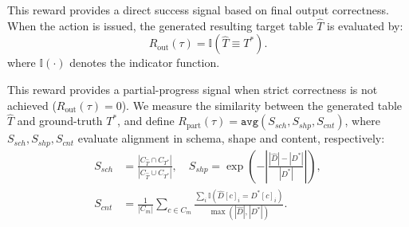 This reward provides a direct success signal based on final output correctness. When the  action is issued, the generated resulting target table $\hat{T}$ is evaluated by:
\begin{equation}
R_{\text{out}}(\tau) = \mathbb{I}(\hat{T} \equiv T^*).
\end{equation}
where $\mathbb{I}(\cdot)$ denotes the indicator function.



This reward provides a partial-progress signal when strict correctness is not achieved ($R_{\text{out}}(\tau)=0$). We measure the similarity between the generated table $\hat{T}$ and ground-truth $T^*$, and define $R_{\text{part}}(\tau) = \texttt{avg}(S_{sch}, S_{shp}, S_{cnt})$, where $S_{sch}, S_{shp}, S_{cnt}$ evaluate alignment in schema, shape and content, respectively:
%
\begin{equation} 
\begin{aligned}
S_{sch} &= \frac{|C_{\hat{T}} \cap C_{T^*}|}{|C_{\hat{T}} \cup C_{T^*}|}, \quad
S_{shp} = \exp\!\left(- \left| \frac{|\hat{D}| - |D^*|}{|D^*|} \right| \right), \\
S_{cnt} &= \frac{1}{|C_{m}|} \sum_{c \in C_{m}} \frac{\sum_{i} \mathbb{I}(\hat{D}[c]_i = D^*[c]_i)}{\max(|\hat{D}|, |D^*|)}.
\end{aligned}
\end{equation}


%
%
%
%

